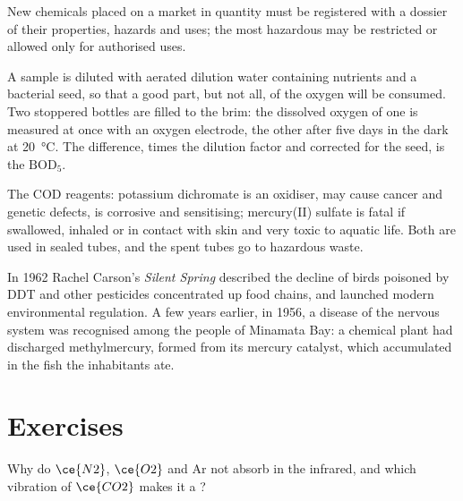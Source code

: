 New chemicals placed on a market in quantity must be registered with a
dossier of their properties, hazards and uses; the most hazardous may be
restricted or allowed only for authorised uses.

\begin{inthelab}
A sample is diluted with aerated dilution water containing nutrients and a
bacterial seed, so that a good part, but not all, of the oxygen will be consumed. Two
stoppered bottles are filled to the brim: the dissolved oxygen of one is measured
at once with an oxygen electrode, the other after five days in the dark at
\qty{20}{\celsius}. The difference, times the dilution factor and corrected for the seed, is the
$\mathrm{BOD_5}$.
\end{inthelab}

\begin{safety}{}
The COD reagents: potassium dichromate is an oxidiser, may cause cancer and
genetic defects, is corrosive and sensitising; mercury(II) sulfate is fatal if
swallowed, inhaled or in contact with skin and very toxic to aquatic life. Both are
used in sealed tubes, and the spent tubes go to hazardous waste.
\end{safety}

\begin{history}
In 1962 Rachel Carson's \textit{Silent Spring} described the decline of birds poisoned by
DDT and other pesticides concentrated up food chains, and launched modern
environmental regulation. A few years earlier, in 1956, a disease of the nervous
system was recognised among the people of Minamata Bay: a chemical plant had
discharged methylmercury, formed from its mercury catalyst, which accumulated
in the fish the inhabitants ate.
\end{history}

\section{Exercises}

\begin{exercise}[$\star$]\label{exo:b3:environmental-toxicology:1}
Why do $\ce{N2}$, $\ce{O2}$ and Ar not absorb in the infrared, and which vibration of $\ce{CO2}$ makes it a
?
\end{exercise}

